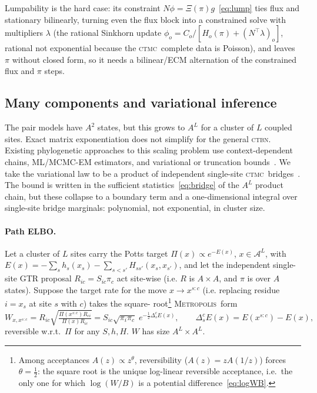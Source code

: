 \documentclass[11pt]{article}
\newcommand{\CTBN}{\textsc{ctbn}}
\newcommand{\CTMC}{\textsc{ctmc}}
\newcommand{\Metrop}{\textsc{Metropolis}}
\newcommand{\Xset}{\mathcal{A}}
\begin{document}
Lumpability is the hard case: its constraint $N\phi=\Xi(\pi)g$~\eqref{eq:lump} ties flux
and stationary bilinearly, turning even the flux block into a constrained solve with
multipliers $\lambda$ (the rational Sinkhorn update
$\phi_o=C_o/[H_o(\pi)+(N^\top\lambda)_o]$, rational not exponential because the \CTMC\
complete data is Poisson), and leaves $\pi$ without closed form, so it needs a
bilinear/ECM alternation of the constrained flux and $\pi$ steps.

\subsection{Many components and variational inference}
\label{sec:multi}

The pair models have $A^2$ states, but this grows to $A^L$ for a cluster of $L$ coupled sites. Exact
matrix exponentiation does not simplify for the general \CTBN.
Existing phylogenetic approaches to this scaling problem use context-dependent chains,
ML/MCMC-EM estimators, and variational or truncation
 bounds~\citep{ArndtBurgeHwa2003NeighborDependent,ChristensenHobolthJensen2005PseudoLikelihood,Hobolth2008MCMCEM,JensenPedersen2000ContextDependent,JojicEtAl2004PhyloHMM,LunterHein2004NearestNeighbor,MathewsSchmidler2025ImportanceSampling,MatsenRalph2022BoundingDependency,SiepelHaussler2004ContextML,WexlerGeiger2007VariationalUpper}.
We take the variational law to be a product of independent single-site \CTMC\
bridges~\citep{cohn2010}. The bound is written in the sufficient statistics~\eqref{eq:bridge} of
the $A^L$ product chain, but these collapse to a boundary term and a one-dimensional
integral over single-site bridge marginals: polynomial, not exponential, in cluster size.

\paragraph{Path ELBO.} Let a cluster of $L$ sites carry the Potts target
$\Pi(x)\propto e^{-E(x)}$, $x\in\Xset^L$, with
$E(x)=-\sum_s h_s(x_s)-\sum_{s<s'}H_{ss'}(x_s,x_{s'})$, and let the independent
single-site GTR proposal $R_{ic}=S_{ic}\pi_c$ act site-wise (i.e. $R$ is $A \times A$, and $\pi$ is over $A$ states).
Suppose the target rate for the move $x\to x^{s:c}$ (i.e. replacing residue $i=x_s$ at site $s$ with $c$) takes the square-
root\footnote{
Among acceptances $A(z)\propto z^\theta$, reversibility ($A(z)=zA(1/z)$) forces
$\theta=\tfrac12$: the square root is the unique log-linear reversible acceptance, i.e.\
the only one for which $\log(W/B)$ is a potential difference~\eqref{eq:logWB}.
}
\Metrop\ form
\begin{equation}\label{eq:sqrtmet}
 W_{x,x^{s:c}}=R_{ic}\sqrt{\tfrac{\Pi(x^{s:c})R_{ci}}{\Pi(x)R_{ic}}}
 =S_{ic}\sqrt{\pi_i\pi_c}\;e^{-\frac12\Delta^c_sE(x)},\qquad
 \Delta^c_sE(x)=E(x^{s:c})-E(x),
\end{equation}
reversible w.r.t.\ $\Pi$ for any $S,h,H$.  $W$ has size $A^L \times A^L$.
\end{document}
